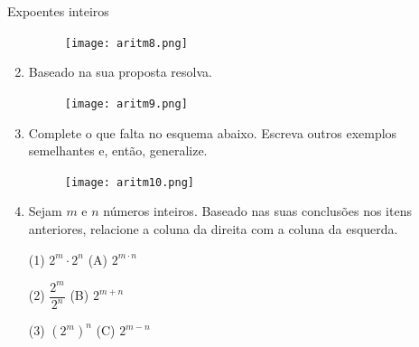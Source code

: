 \begin{task}{Expoentes inteiros}
\begin{enumerate}
\begin{figure}[H]
\centering
\texttt{[image: aritm8.png]}
\end{figure}

\item{}
Baseado na sua proposta resolva.

\begin{figure}[H]
\centering
\texttt{[image: aritm9.png]}
\end{figure}

\item{}
Complete o que falta no esquema abaixo. Escreva outros exemplos semelhantes e, então, generalize.

\begin{figure}[H]
\centering
\texttt{[image: aritm10.png]}
\end{figure}

\item{}
Sejam $m$ e $n$ números inteiros. Baseado nas suas conclusões nos itens anteriores, relacione a coluna da direita com a coluna da esquerda.

 (1) $2^{m} \cdot 2^{n}$  \hspace{1,0cm} (A) $2^{m \cdot n}$

 (2) $\dfrac{2^{m}}{2^{n}}$   \hspace{1,5cm} (B) $2^{m + n}$

 (3) $(2^{m})^{n}$  \hspace{1,1cm} (C) $2^{m - n}$

\end{enumerate}

\end{task}

